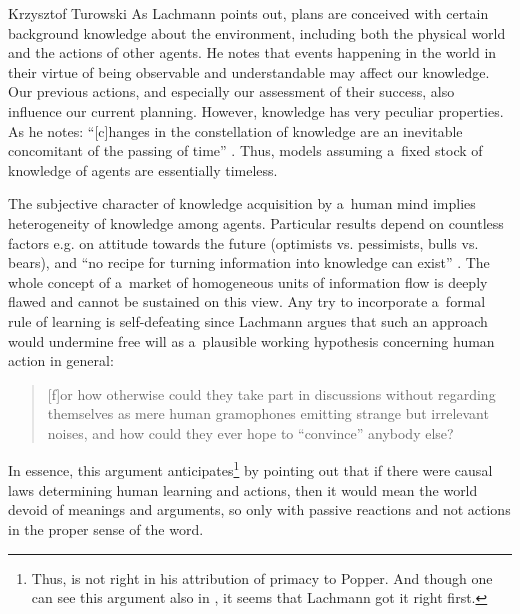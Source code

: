\begin{artengenv}{Krzysztof Turowski}
As Lachmann points out, plans are conceived with certain background knowledge about the environment, including both the physical world and the actions of other agents.
He notes that events happening in the world in their virtue of being observable and understandable may affect our knowledge.
Our previous actions, and especially our assessment of their success, also influence our current planning.
However, knowledge has very peculiar properties. As he notes: ``[c]hanges in the constellation of knowledge are an inevitable concomitant of the passing of time'' \parencite[200]{lachmann-hayek}.
Thus, models assuming a~fixed stock of knowledge of agents are essentially timeless.

The subjective character of knowledge acquisition by a~human mind implies heterogeneity of knowledge among agents.
Particular results depend on countless factors e.g. on attitude towards the future (optimists vs. pessimists, bulls vs. bears), and ``no recipe for turning information into knowledge can exist'' \parencite[51]{lachmann1986market}.
The whole concept of a~market of homogeneous units of information flow is deeply flawed and cannot be sustained on this view.
Any try to incorporate a~formal rule of learning is self-defeating since Lachmann argues that such an approach would undermine free will as a~plausible working hypothesis concerning human action in general:
\begin{quote}
[f]or how otherwise could they take part in discussions without regarding themselves as mere human gramophones emitting strange but irrelevant noises, and how could they ever hope to ``convince'' anybody else? \parencite[167]{lachmann-science}
\end{quote}
In essence, this argument anticipates\footnote{Thus, \textcite[38]{hoppe} is not right in his attribution of primacy to Popper. And though one can see this argument also in \textcite[104]{shackle-time}, it seems that Lachmann got it right first.} \textcite[10]{popper-poverty} by pointing out that if there were causal laws determining human learning and actions, then it would mean the world devoid of meanings and arguments, so only with passive reactions and not actions in the proper sense of the word.


\end{artengenv}
